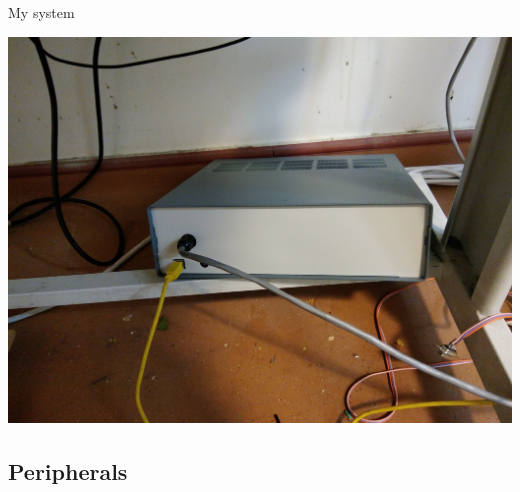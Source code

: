 \documentclass[12pt]{beamer}
\begin{document}
\begin{frame}{My system}
\begin{center}
\includegraphics[width=0.6\linewidth]{boitier.jpg}
\end{center}
\end{frame}

\subsection{Peripherals}
\end{document}
